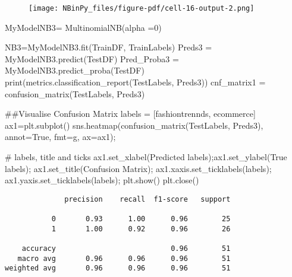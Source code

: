 \documentclass[
  letterpaper,
  DIV=11,
  numbers=noendperiod]{scrartcl}
\newenvironment{Shaded}{\begin{snugshade}}{\end{snugshade}}
\newcommand{\BuiltInTok}[1]{\textcolor[rgb]{0.00,0.23,0.31}{#1}}
\newcommand{\CommentTok}[1]{\textcolor[rgb]{0.37,0.37,0.37}{#1}}
\newcommand{\DecValTok}[1]{\textcolor[rgb]{0.68,0.00,0.00}{#1}}
\newcommand{\NormalTok}[1]{\textcolor[rgb]{0.00,0.23,0.31}{#1}}
\newcommand{\OperatorTok}[1]{\textcolor[rgb]{0.37,0.37,0.37}{#1}}
\newcommand{\StringTok}[1]{\textcolor[rgb]{0.13,0.47,0.30}{#1}}
\newcommand{\VariableTok}[1]{\textcolor[rgb]{0.07,0.07,0.07}{#1}}
\begin{document}
\begin{figure}[H]

{\centering \texttt{[image: NBinPy\_files/figure-pdf/cell-16-output-2.png]}

}

\end{figure}

\begin{Shaded}
\begin{Highlighting}[]
\NormalTok{MyModelNB3}\OperatorTok{=}\NormalTok{ MultinomialNB(alpha }\OperatorTok{=}\DecValTok{0}\NormalTok{)}

\NormalTok{NB3}\OperatorTok{=}\NormalTok{MyModelNB3.fit(TrainDF, TrainLabels)}
\NormalTok{Preds3 }\OperatorTok{=}\NormalTok{ MyModelNB3.predict(TestDF)}
\NormalTok{Pred\_Proba3 }\OperatorTok{=}\NormalTok{ MyModelNB3.predict\_proba(TestDF)}
\BuiltInTok{print}\NormalTok{(metrics.classification\_report(TestLabels, Preds3))}
\NormalTok{cnf\_matrix1 }\OperatorTok{=}\NormalTok{ confusion\_matrix(TestLabels, Preds3)}

\CommentTok{\#\#Visualise Confusion Matrix}
\NormalTok{labels }\OperatorTok{=}\NormalTok{ [}\StringTok{\textquotesingle{}fashiontrennds\textquotesingle{}}\NormalTok{, }\StringTok{\textquotesingle{}ecommerce\textquotesingle{}}\NormalTok{]}
\NormalTok{ax1}\OperatorTok{=}\NormalTok{plt.subplot()}
\NormalTok{sns.heatmap(confusion\_matrix(TestLabels, Preds3), annot}\OperatorTok{=}\VariableTok{True}\NormalTok{, fmt}\OperatorTok{=}\StringTok{\textquotesingle{}g\textquotesingle{}}\NormalTok{, ax}\OperatorTok{=}\NormalTok{ax1)}\OperatorTok{;}

\CommentTok{\# labels, title and ticks}
\NormalTok{ax1.set\_xlabel(}\StringTok{\textquotesingle{}Predicted labels\textquotesingle{}}\NormalTok{)}\OperatorTok{;}\NormalTok{ax1.set\_ylabel(}\StringTok{\textquotesingle{}True labels\textquotesingle{}}\NormalTok{)}\OperatorTok{;} 
\NormalTok{ax1.set\_title(}\StringTok{\textquotesingle{}Confusion Matrix\textquotesingle{}}\NormalTok{)}\OperatorTok{;} 
\NormalTok{ax1.xaxis.set\_ticklabels(labels)}\OperatorTok{;}\NormalTok{ ax1.yaxis.set\_ticklabels(labels)}\OperatorTok{;}
\NormalTok{plt.show()}
\NormalTok{plt.close()}
\end{Highlighting}
\end{Shaded}

\begin{verbatim}
              precision    recall  f1-score   support

           0       0.93      1.00      0.96        25
           1       1.00      0.92      0.96        26

    accuracy                           0.96        51
   macro avg       0.96      0.96      0.96        51
weighted avg       0.96      0.96      0.96        51
\end{verbatim}
\end{document}
